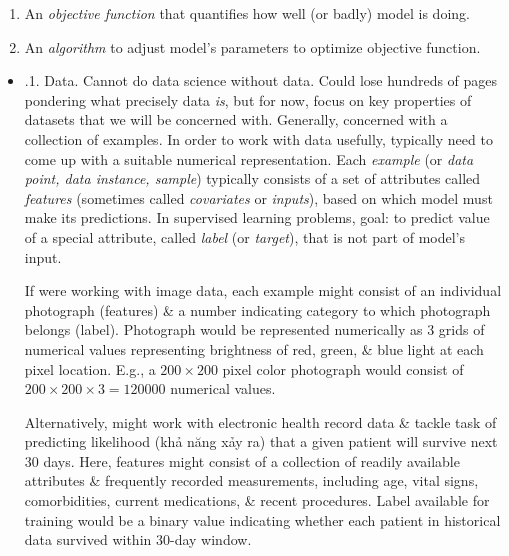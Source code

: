 \documentclass{article}
\begin{document}
\begin{enumerate}
\begin{itemize}
\begin{itemize}
\begin{enumerate}
				\item An {\it objective function} that quantifies how well (or badly) model is doing.
				\item An {\it algorithm} to adjust model's parameters to optimize objective function.
			\end{enumerate}
			\begin{itemize}
				\item {.1. Data.} Cannot do data science without data. Could lose hundreds of pages pondering what precisely data {\it is}, but for now, focus on key properties of datasets that we will be concerned with. Generally, concerned with a collection of examples. In order to work with data usefully, typically need to come up with a suitable numerical representation. Each {\it example} (or {\it data point, data instance, sample}) typically consists of a set of attributes called {\it features} (sometimes called {\it covariates} or {\it inputs}), based on which model must make its predictions. In supervised learning problems, goal: to predict value of a special attribute, called {\it label} (or {\it target}), that is not part of model's input.
				
				If were working with image data, each example might consist of an individual photograph (features) \& a number indicating category to which photograph belongs (label). Photograph would be represented numerically as 3 grids of numerical values representing brightness of red, green, \& blue light at each pixel location. E.g., a $200\times200$ pixel color photograph would consist of $200\times200\times3 = 120000$ numerical values.
				
				Alternatively, might work with electronic health record data \& tackle task of predicting likelihood (khả năng xảy ra) that a given patient will survive next 30 days. Here, features might consist of a collection of readily available attributes \& frequently recorded measurements, including age, vital signs, comorbidities, current medications, \& recent procedures. Label available for training would be a binary value indicating whether each patient in historical data survived within 30-day window.
				

\end{itemize}
\end{itemize}
\end{itemize}
\end{enumerate}
\end{document}
